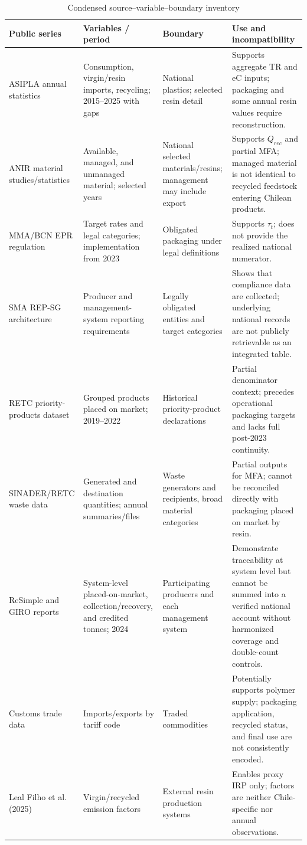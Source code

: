 \documentclass[review,10pt]{elsarticle}
\begin{document}
\begin{longtable}{|L{3.0cm}|L{3.2cm}|L{3.2cm}|L{5.6cm}|}
\caption{Condensed source--variable--boundary inventory}
\label{tab:s_boundary_inventory}\\
\hline
\textbf{Public series} & \textbf{Variables / period} & \textbf{Boundary} & \textbf{Use and incompatibility} \\
\hline
\endfirsthead
\hline
ASIPLA annual statistics & Consumption, virgin/resin imports, recycling; 2015--2025 with gaps & National plastics; selected resin detail & Supports aggregate TR and eC inputs; packaging and some annual resin values require reconstruction. \\
\hline
ANIR material studies/statistics & Available, managed, and unmanaged material; selected years & National selected materials/resins; management may include export & Supports $Q_{rec}$ and partial MFA; managed material is not identical to recycled feedstock entering Chilean products. \\
\hline
MMA/BCN EPR regulation & Target rates and legal categories; implementation from 2023 & Obligated packaging under legal definitions & Supports $\tau_t$; does not provide the realized national numerator. \\
\hline
SMA REP-SG architecture & Producer and management-system reporting requirements & Legally obligated entities and target categories & Shows that compliance data are collected; underlying national records are not publicly retrievable as an integrated table. \\
\hline
RETC priority-products dataset & Grouped products placed on market; 2019--2022 & Historical priority-product declarations & Partial denominator context; precedes operational packaging targets and lacks full post-2023 continuity. \\
\hline
SINADER/RETC waste data & Generated and destination quantities; annual summaries/files & Waste generators and recipients, broad material categories & Partial outputs for MFA; cannot be reconciled directly with packaging placed on market by resin. \\
\hline
ReSimple and GIRO reports & System-level placed-on-market, collection/recovery, and credited tonnes; 2024 & Participating producers and each management system & Demonstrate traceability at system level but cannot be summed into a verified national account without harmonized coverage and double-count controls. \\
\hline
Customs trade data & Imports/exports by tariff code & Traded commodities & Potentially supports polymer supply; packaging application, recycled status, and final use are not consistently encoded. \\
\hline
Leal Filho et al. (2025) & Virgin/recycled emission factors & External resin production systems & Enables proxy IRP only; factors are neither Chile-specific nor annual observations. \\
\hline
\end{longtable}
\end{document}
